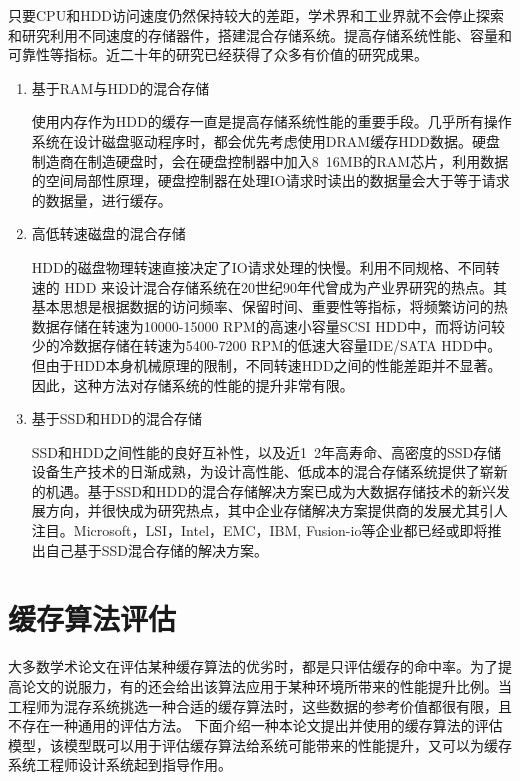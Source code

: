 只要CPU和HDD访问速度仍然保持较大的差距，学术界和工业界就不会停止探索和研究利用不同速度的存储器件，搭建混合存储系统。提高存储系统性能、容量和可靠性等指标。近二十年的研究已经获得了众多有价值的研究成果。

\begin{enumerate}

\item 基于RAM与HDD的混合存储

使用内存作为HDD的缓存一直是提高存储系统性能的重要手段。几乎所有操作系统在设计磁盘驱动程序时，都会优先考虑使用DRAM缓存HDD数据。硬盘制造商在制造硬盘时，会在硬盘控制器中加入8~16MB的RAM芯片，利用数据的空间局部性原理，硬盘控制器在处理IO请求时读出的数据量会大于等于请求的数据量，进行缓存。

\item 高低转速磁盘的混合存储

HDD的磁盘物理转速直接决定了IO请求处理的快慢。利用不同规格、不同转速的 HDD 来设计混合存储系统在20世纪90年代曾成为产业界研究的热点。其基本思想是根据数据的访问频率、保留时间、重要性等指标，将频繁访问的热数据存储在转速为10000-15000 RPM的高速小容量SCSI HDD中，而将访问较少的冷数据存储在转速为5400-7200 RPM的低速大容量IDE/SATA HDD中。但由于HDD本身机械原理的限制，不同转速HDD之间的性能差距并不显著。因此，这种方法对存储系统的性能的提升非常有限。

\item 基于SSD和HDD的混合存储

SSD和HDD之间性能的良好互补性，以及近1~2年高寿命、高密度的SSD存储设备生产技术的日渐成熟，为设计高性能、低成本的混合存储系统提供了崭新的机遇。基于SSD和HDD的混合存储解决方案已成为大数据存储技术的新兴发展方向，并很快成为研究热点，其中企业存储解决方案提供商的发展尤其引人注目。Microsoft，LSI，Intel，EMC，IBM, Fusion-io等企业都已经或即将推出自己基于SSD混合存储的解决方案。

\end{enumerate}

\section{缓存算法评估}
\label{sec:cache_evaluation}

大多数学术论文在评估某种缓存算法的优劣时，都是只评估缓存的命中率。为了提高论文的说服力，有的还会给出该算法应用于某种环境所带来的性能提升比例。当工程师为混存系统挑选一种合适的缓存算法时，这些数据的参考价值都很有限，且不存在一种通用的评估方法。
下面介绍一种本论文提出并使用的缓存算法的评估模型，该模型既可以用于评估缓存算法给系统可能带来的性能提升，又可以为缓存系统工程师设计系统起到指导作用。

